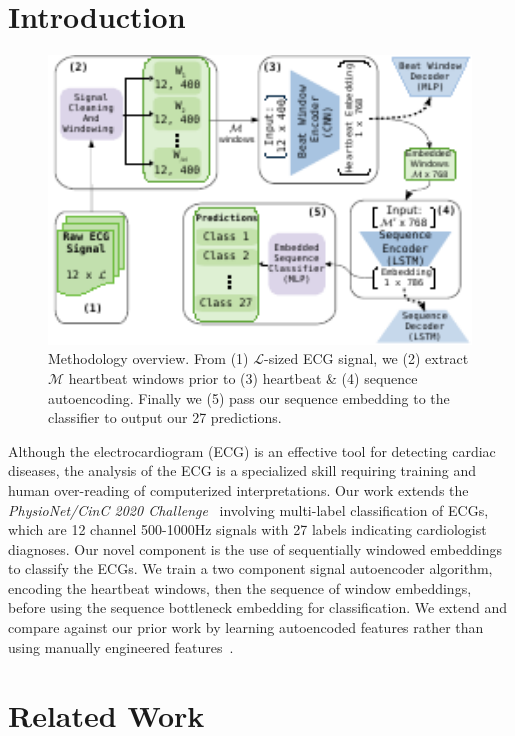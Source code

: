 \documentclass[\main/thesis.tex]{subfiles}
\begin{document}
\section{Introduction}

\begin{figure}[t]
    \centering
    \includegraphics[width=12cm]{figure/aenc_methodology.pdf}
    \caption{Methodology overview. From (1) $\mathcal{L}$-sized ECG signal, we (2) extract $\mathcal{M}$ heartbeat windows prior to (3) heartbeat \& (4) sequence autoencoding. Finally we (5) pass our sequence embedding to the classifier to output our 27 predictions.}
    \label{fig:aenc_methodology}
\end{figure}

Although the electrocardiogram (ECG) is an effective tool for detecting cardiac diseases, the analysis of the ECG is a specialized skill requiring training and human over-reading of computerized interpretations.
Our work extends the \emph{PhysioNet/CinC 2020 Challenge}~\cite{physionet_challenge_2020} involving multi-label classification of ECGs, which are 12 channel 500-1000Hz signals with 27 labels indicating cardiologist diagnoses.
Our novel component is the use of sequentially windowed embeddings to classify the ECGs.
We train a two component signal autoencoder algorithm, encoding the heartbeat windows, then the sequence of window embeddings, before using the sequence bottleneck embedding for classification.
We extend and compare against our prior work by learning autoencoded features rather than using manually engineered features~\cite{wong2020CINC-multilabel-ECG}.

\section{Related Work}
\end{document}
